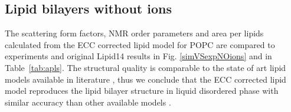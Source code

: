 \documentclass[aip,jcp,twocolumn]{revtex4}
\begin{document}
\subsection{Lipid bilayers without ions}
The scattering form factors, NMR order parameters and area per lipids calculated from 
the ECC corrected lipid model for POPC are compared to experiments and original
Lipid14 results in Fig. \ref{simVSexpNOions} and in Table~\ref{tab:apls}. 
The structural quality is comparable to the state of art lipid models available in literature \cite{ollila16},
thus we conclude that the ECC corrected lipid model reproduces the lipid bilayer structure
in liquid disordered phase with similar accuracy than other available models
.
\end{document}
